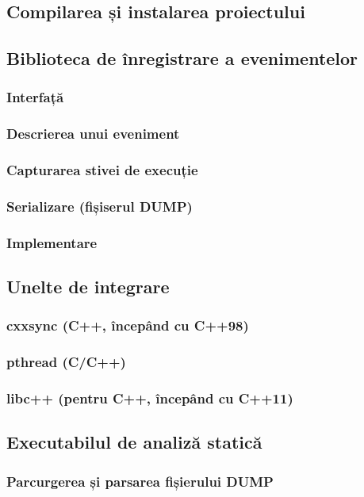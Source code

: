 \subsection{Compilarea și instalarea proiectului}
\subsection{Biblioteca de înregistrare a evenimentelor}
\subsubsection{Interfață}
\subsubsection{Descrierea unui eveniment}
\subsubsection{Capturarea stivei de execuție}
\subsubsection{Serializare (fișiserul DUMP)}
\subsubsection{Implementare}
\subsection{Unelte de integrare}
\subsubsection{cxxsync (C++, începând cu C++98)}
\subsubsection{pthread (C/C++)}
\subsubsection{libc++ (pentru C++, începând cu C++11)}
\subsection{Executabilul de analiză statică}
\subsubsection{Parcurgerea și parsarea fișierului DUMP}
